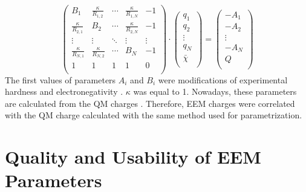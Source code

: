 \begin{equation} \label{eq:eem}
    \left(
    \begin{array}{ccccc}
        B_1                    & \frac{\kappa}{R_{1,2}} & \cdots & \frac{\kappa}{R_{1,N}} & -1     \\
        \frac{\kappa}{R_{2,1}} & B_2                    & \cdots & \frac{\kappa}{R_{2,N}} & -1     \\
        \vdots                 & \vdots                 & \ddots & \vdots                 & \vdots \\
        \frac{\kappa}{R_{N,1}} & \frac{\kappa}{R_{N,2}} & \cdots & B_N                    & -1     \\ 
        1                      & 1                      & 1      & 1                      & 0      \\  
    \end{array}
    \right) \cdot
    \left(
    \begin{array}{c}
        q_1        \\
        q_2        \\
        \vdots     \\
        q_N        \\
        \bar{\chi} \\
    \end{array}
    \right) =
    \left(
    \begin{array}{c}
        -A_1   \\
        -A_2   \\
        \vdots \\
        -A_N   \\
        Q      \\
    \end{array}
    \right)
\end{equation}
The first values of parameters $A_i$ and $B_i$ were modifications
of experimental hardness and electronegativity \cite{Mortier1986}. $\kappa$ was
equal to 1. Nowadays, these parameters are calculated from the QM
charges \cite{Baekelandt1991, Bultinck2002, Bultinck2004,
Chaves2006, Svobodova2007, Jirouskova2009, Ouyang2009}.
Therefore, EEM charges were correlated with the QM
charge calculated with the same method used for parametrization.

\section{Quality and Usability of EEM Parameters}

